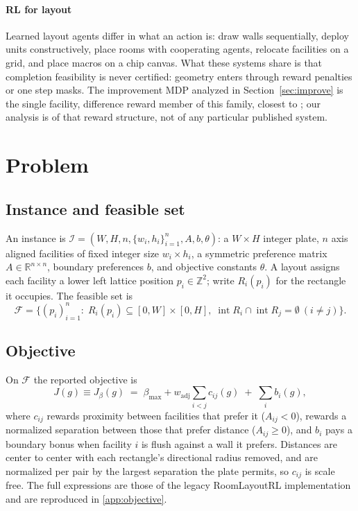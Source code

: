 \documentclass[preprint,12pt,authoryear]{elsarticle}
\newcommand{\R}{\mathbb{R}}
\newcommand{\Z}{\mathbb{Z}}
\newcommand{\cF}{\mathcal{F}}
\begin{document}
\paragraph{RL for layout}
Learned layout agents differ in what an action is: \citet{kakooee2024reimagining}
draw walls sequentially, \citet{Ikeda2022FacilityRL} deploy units constructively,
\citet{GanLuo2025MADRL} place rooms with cooperating agents,
\citet{Heinbach2023MDPRL} relocate facilities on a grid, and
\citet{Mirhoseini2021Chip} place macros on a chip canvas. What these systems
share is that completion feasibility is never certified: geometry enters through
reward penalties or one step masks. The improvement MDP analyzed in
Section~\ref{sec:improve} is the single facility, difference reward member of
this family, closest to \citet{Heinbach2023MDPRL}; our analysis is of that
reward structure, not of any particular published system.

\section{Problem}
\label{sec:problem}

\subsection{Instance and feasible set}
An instance is
$\mathcal{I}=(W,H,n,\{w_i,h_i\}_{i=1}^n,A,b,\theta)$: a $W\times H$ integer
plate, $n$ axis aligned facilities of fixed integer size $w_i\times h_i$, a
symmetric preference matrix $A\in\R^{n\times n}$, boundary preferences $b$, and
objective constants $\theta$. A layout assigns each facility a lower left lattice
position $p_i\in\Z^2$; write $R_i(p_i)$ for the rectangle it occupies. The
feasible set is
\begin{equation}
\cF=\Big\{(p_i)_{i=1}^n:\;R_i(p_i)\subseteq[0,W]\times[0,H],\;
\operatorname{int}R_i\cap\operatorname{int}R_j=\emptyset\ (i\neq j)\Big\}.
\label{eq:feasible}
\end{equation}

\subsection{Objective}
On $\cF$ the reported objective is
\begin{equation}
J(g)\equiv J_{\beta}(g)\;=\;\beta_{\max}
 +w_{\mathrm{adj}}\sum_{i<j} c_{ij}(g)\;+\;\sum_i b_i(g),
\label{eq:objective}
\end{equation}
where $c_{ij}$ rewards proximity between facilities that prefer it
($A_{ij}<0$), rewards a normalized separation between those that prefer distance
($A_{ij}\ge 0$), and $b_i$ pays a
boundary bonus when facility $i$ is flush against a wall it prefers. Distances
are center to center with each rectangle's directional radius removed, and are
normalized per pair by the largest separation the plate permits, so $c_{ij}$ is
scale free. The full expressions are those of the legacy RoomLayoutRL
implementation \citep{RoomLayoutRL2026} and
are reproduced in \ref{app:objective}.
\end{document}
